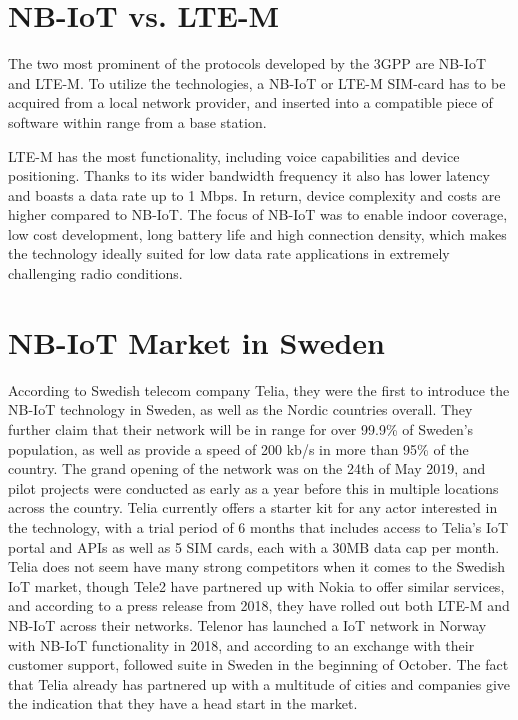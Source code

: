 \section{NB-IoT vs. LTE-M}
The two most prominent of the protocols developed by the 3GPP are NB-IoT and LTE-M. To utilize the technologies, a NB-IoT or LTE-M SIM-card has to be acquired from a local network provider, and inserted into a compatible piece of software within range from a base station.

LTE-M has the most functionality, including voice capabilities and device positioning. Thanks to its wider bandwidth frequency it also has lower latency and boasts a data rate up to 1 Mbps.\cite{ericsson-blog} In return, device complexity and costs are higher compared to NB-IoT. The focus of NB-IoT was to enable indoor coverage, low cost development, long battery life and high connection density, which makes the technology ideally suited for low data rate applications in extremely challenging radio conditions. 

\section{NB-IoT Market in Sweden}
According to Swedish telecom company Telia, they were the first to introduce the NB-IoT technology in Sweden, as well as the Nordic countries overall.\cite{telia-nb} They further claim that their network will be in range for over 99.9\% of Sweden's population, as well as provide a speed of 200 kb/s in more than 95\% of the country.\cite{telia-first} The grand opening of the network was on the 24th of May 2019, and pilot projects were conducted as early as a year before this in multiple locations across the country. Telia currently offers a starter kit  for any actor interested in the technology, with a trial period of 6 months that includes access to Telia's IoT portal and APIs as well as 5 SIM cards, each with a 30MB data cap per month. Telia does not seem have many strong competitors when it comes to the Swedish IoT market, though Tele2 have partnered up with Nokia to offer similar services, and according to a press release from 2018, they have rolled out both LTE-M and NB-IoT across their networks.\cite{tele2-nokia} Telenor has launched a IoT network in Norway with NB-IoT functionality in 2018\cite{telenor-iot}, and according to an exchange with their customer support, followed suite in Sweden in the beginning of October. The fact that Telia already has partnered up with a multitude of cities and companies give the indication that they have a head start in the market.